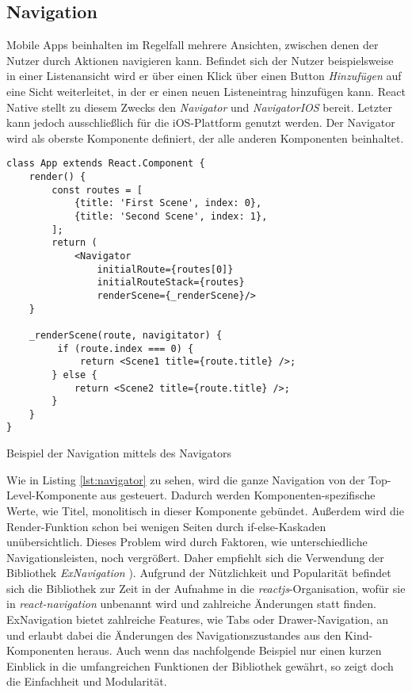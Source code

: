 \subsection{Navigation}
Mobile Apps beinhalten im Regelfall mehrere Ansichten, zwischen denen der Nutzer durch Aktionen navigieren kann. Befindet sich der Nutzer beispielsweise in einer Listenansicht wird er über einen Klick über einen Button \textit{Hinzufügen} auf eine Sicht weiterleitet, in der er einen neuen Listeneintrag hinzufügen kann. React Native stellt zu diesem Zwecks den \textit{Navigator} und \textit{NavigatorIOS} bereit. Letzter kann jedoch ausschließlich für die iOS-Plattform genutzt werden. Der Navigator wird als oberste Komponente definiert, der alle anderen Komponenten beinhaltet. 
\begin{listing}[H]
    \begin{verbatim}
class App extends React.Component {
    render() {
        const routes = [
            {title: 'First Scene', index: 0},
            {title: 'Second Scene', index: 1},
        ];
        return (
            <Navigator
                initialRoute={routes[0]}
                initialRouteStack={routes}
                renderScene={_renderScene}/>
    }
    
    _renderScene(route, navigitator) {
         if (route.index === 0) {
             return <Scene1 title={route.title} />;
        } else {
            return <Scene2 title={route.title} />;
        }
    }
}
    \end{verbatim}
    \caption{Beispiel der Navigation mittels des Navigators}
    \label{lst:navigator}
\end{listing}

Wie in Listing \ref{lst:navigator} zu sehen, wird die ganze Navigation von der Top-Level-Komponente aus gesteuert. Dadurch werden Komponenten-spezifische Werte, wie Titel, monolitisch in dieser Komponente gebündet. Außerdem wird die Render-Funktion schon bei wenigen Seiten durch if-else-Kaskaden unübersichtlich. Dieses Problem wird durch Faktoren, wie unterschiedliche Navigationsleisten, noch vergrößert. Daher empfiehlt sich die Verwendung der Bibliothek \textit{ExNavigation} \cite{exNavigation_2016}). Aufgrund der Nützlichkeit und Popularität befindet sich die Bibliothek zur Zeit in der Aufnahme in die \textit{reactjs}-Organisation, wofür sie in \textit{react-navigation} unbenannt wird und zahlreiche Änderungen statt finden. ExNavigation bietet zahlreiche Features, wie Tabs oder Drawer-Navigation, an und erlaubt dabei die Änderungen des Navigationszustandes aus den Kind-Komponenten heraus. Auch wenn das nachfolgende Beispiel nur einen kurzen Einblick in die umfangreichen Funktionen der Bibliothek gewährt, so zeigt doch die Einfachheit und Modularität.

